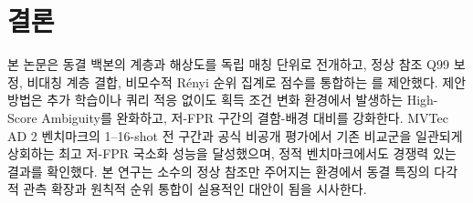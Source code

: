 \section{결론}
\label{sec:conclusion}

본 논문은 동결 백본의 계층과 해상도를 독립 매칭 단위로 전개하고, 정상 참조 Q99 보정, 비대칭 계층 결합, 비모수적 Rényi 순위 집계로 점수를 통합하는 \textbf{\method}를 제안했다.
제안 방법은 추가 학습이나 쿼리 적응 없이도 획득 조건 변화 환경에서 발생하는 High-Score Ambiguity를 완화하고, 저-FPR 구간의 결함-배경 대비를 강화한다.
MVTec AD 2 벤치마크의 1--16-shot 전 구간과 공식 비공개 평가에서 기존 비교군을 일관되게 상회하는 최고 저-FPR 국소화 성능을 달성했으며, 정적 벤치마크에서도 경쟁력 있는 결과를 확인했다.
본 연구는 소수의 정상 참조만 주어지는 환경에서 동결 특징의 다각적 관측 확장과 원칙적 순위 통합이 실용적인 대안이 됨을 시사한다.
